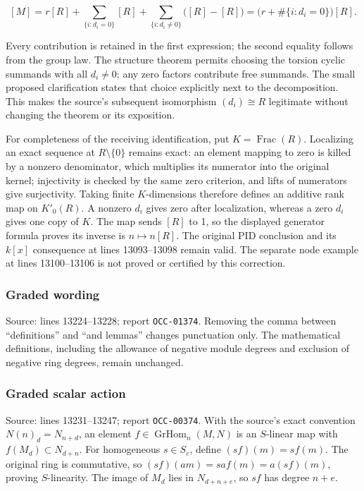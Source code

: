 \[
[M]=r[R]+\sum_{\{i:d_i=0\}}[R]
       +\sum_{\{i:d_i\ne0\}}\bigl([R]-[R]\bigr)
     =\bigl(r+\#\{i:d_i=0\}\bigr)[R].
\]

Every contribution is retained in the first expression; the second equality follows from the group law. The structure theorem permits choosing the torsion cyclic summands with all \(d_i\ne0\); any zero factors contribute free summands. The small proposed clarification states that choice explicitly next to the decomposition. This makes the source's subsequent isomorphism \((d_i)\cong R\) legitimate without changing the theorem or its exposition.

For completeness of the receiving identification, put \(K=\operatorname{Frac}(R)\). Localizing an exact sequence at \(R\setminus\{0\}\) remains exact: an element mapping to zero is killed by a nonzero denominator, which multiplies its numerator into the original kernel; injectivity is checked by the same zero criterion, and lifts of numerators give surjectivity. Taking finite \(K\)-dimensions therefore defines an additive rank map on \(K'_0(R)\). A nonzero \(d_i\) gives zero after localization, whereas a zero \(d_i\) gives one copy of \(K\). The map sends \([R]\) to 1, so the displayed generator formula proves its inverse is \(n\mapsto n[R]\). The original PID conclusion and its \(k[x]\) consequence at lines 13093--13098 remain valid. The separate node example at lines 13100--13106 is not proved or certified by this correction.

\subsubsection{Graded wording}\label{algebra-proof-001-graded-wording}

Source: lines 13224--13228; report \texttt{OCC-01374}. Removing the comma between ``definitions'' and ``and lemmas'' changes punctuation only. The mathematical definitions, including the allowance of negative module degrees and exclusion of negative ring degrees, remain unchanged.

\subsubsection{Graded scalar action}\label{algebra-proof-001-graded-scalar-action}

Source: lines 13231--13247; report \texttt{OCC-00374}. With the source's exact convention \(N(n)_d=N_{n+d}\), an element \(f\in\operatorname{GrHom}_n(M,N)\) is an \(S\)-linear map with \(f(M_d)\subset N_{d+n}\). For homogeneous \(s\in S_e\), define \((sf)(m)=s f(m)\). The original ring is commutative, so \((sf)(am)=sa f(m)=a(sf)(m)\), proving \(S\)-linearity. The image of \(M_d\) lies in \(N_{d+n+e}\), so \(sf\) has degree \(n+e\).

